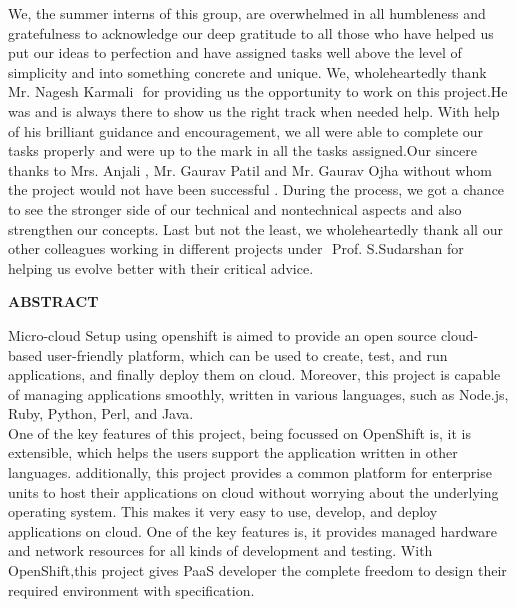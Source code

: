 \documentclass[11pt]{report}
\begin{document}
	\large
	We, the summer interns of this group, are overwhelmed in all humbleness and
	gratefulness to acknowledge our deep gratitude to all those who have helped us put
	our ideas to perfection and have assigned tasks well above the level of simplicity and
	into something concrete and unique.
	We,  wholeheartedly thank ​ Mr. Nagesh Karmali ​ for providing us the opportunity to work on this
	project.He was and is always there to show us the right track when needed help.
	With help of his brilliant guidance and encouragement, we all were able to complete
	our tasks properly and were up to the mark in all the tasks assigned.Our sincere thanks to
	Mrs. Anjali , Mr. Gaurav Patil and Mr. Gaurav Ojha without whom the project would not have been
	successful .
	 During the
	process, we got a chance to see the stronger side of our technical and nontechnical
	aspects and also strengthen our concepts.
	Last but not the least, we wholeheartedly thank all our other colleagues working in
	different projects under ​ Prof. S.Sudarshan for helping us evolve better with their
	critical advice.
	
	\pagebreak
	
	\begin{center}
		\huge
		
		\textbf{ABSTRACT}
	\end{center}
	\vspace{3cm}
	Micro-cloud Setup using openshift is aimed to provide an open source cloud-based user-friendly platform, which can be used to create, test, and run applications, and                    
	finally deploy them on cloud.
	Moreover, this project is capable of managing applications smoothly, written in various languages, such as Node.js, Ruby, Python, Perl, and Java. 
	\ \\
	One of the key features of this project, being focussed on OpenShift is, it is extensible, which helps the users support the application written in other languages.
	additionally, this project provides a common platform for enterprise units to host their applications on cloud without worrying about the underlying operating system. This makes it very easy to use, develop, and deploy applications on cloud. One of the key features is, it provides managed hardware and network resources for all kinds of development and testing. With OpenShift,this project gives PaaS developer the complete freedom to design their required environment with specification.
	\listoffigures
	\tableofcontents
	
	\pagebreak
	
\end{document}
